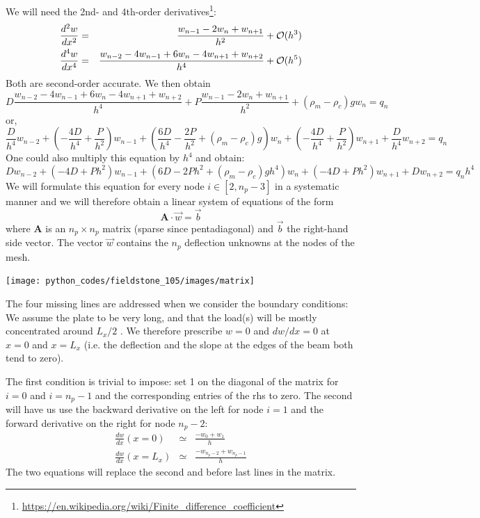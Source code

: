 We will need the 2nd- and 4th-order 
derivatives\footnote{\url{https://en.wikipedia.org/wiki/Finite_difference_coefficient}}:
\begin{eqnarray}
\frac{d^2w}{dx^2} &=& \frac{w_{n-1}-2w_n+w_{n+1}}{h^2} 
+{\cal O}(h^3) \\
\frac{d^4w}{dx^4} &=& \frac{w_{n-2}-4w_{n-1}+6w_n-4w_{n+1}+w_{n+2}}{h^4}
+{\cal O}(h^5)
\end{eqnarray}
Both are second-order accurate. We then obtain 
\[
D\frac{w_{n-2}-4w_{n-1}+6w_n-4w_{n+1}+w_{n+2}}{h^4}
+P\frac{w_{n-1}-2w_n+w_{n+1}}{h^2} 
+(\rho_m-\rho_c)g w_n = q_n
\]
or, 
\[
\boxed{
\frac{D}{h^4} w_{n-2}
+\left(-\frac{4D}{h^4}+\frac{P}{h^2}\right)w_{n-1}
+\left(\frac{6D}{h^4}-\frac{2P}{h^2} +(\rho_m-\rho_c)g \right)w_n
+\left(-\frac{4D}{h^4}+\frac{P}{h^2}\right)w_{n+1}
+\frac{D}{h^4} w_{n+2} = q_n
}
\]
One could also multiply this equation by $h^4$ and obtain:
\[
D w_{n-2}
+\left(-4D+Ph^2\right)w_{n-1}
+\left(6D-2Ph^2 +(\rho_m-\rho_c)g h^4 \right)w_n
+\left(-4D+Ph^2\right)w_{n+1}
+D w_{n+2} = q_n h^4
\]
We will formulate this equation for every node $i\in[2,n_p-3]$
in a systematic manner and we will therefore obtain a linear system of equations of the form 
\[
{\bm A} \cdot \vec{w} = \vec{b}
\]
where ${\bm A}$ is an $n_p\times n_p$ matrix (sparse since pentadiagonal) 
and $\vec{b}$ the right-hand side vector. 
The vector $\vec{w}$ contains the $n_p$ deflection unknowns at the nodes of the mesh.

\begin{center}
\texttt{[image: python\_codes/fieldstone\_105/images/matrix]}
\end{center}

The four missing lines are addressed when we consider the boundary conditions:
We assume the plate to be very long, and that the load(s) will be 
mostly concentrated around $L_x/2$ . We therefore 
prescribe $w=0$ and $dw/dx=0$ at $x=0$ and $x=L_x$ (i.e. the deflection and 
the slope at the edges of the beam both tend to zero).

The first condition is trivial to impose: set 1 on the diagonal of the 
matrix for $i=0$ and $i=n_p-1$ and the corresponding entries of the rhs to zero. 
The second will have us use the backward derivative on the left for node $i=1$ and 
the forward derivative on the right for node $n_p-2$:
\begin{eqnarray}
\frac{dw}{dx} (x=0)   &\simeq& \frac{-w_0+w_1}{h} \nonumber\\
\frac{dw}{dx} (x=L_x) &\simeq& \frac{-w_{n_p-2}+w_{n_p-1}}{h}
\end{eqnarray}
The two equations will replace the second and before last 
lines in the matrix.

